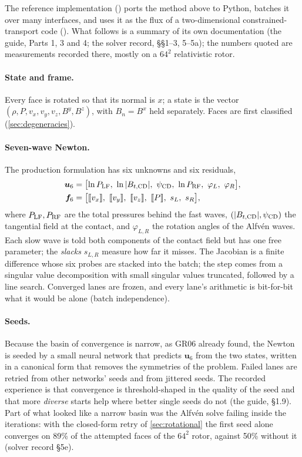 \documentclass[11pt,a4paper,oneside,openany]{book}
\theoremstyle{definition}
\theoremstyle{plain}
\theoremstyle{remark}
\newcommand{\jump}[1]{\llbracket #1\rrbracket}
\newcommand{\Ptot}{P}
\newcommand{\file}[1]{\texttt{\detokenize{#1}}}
\begin{document}
The reference implementation (\file{rmhd_final}) ports the method above to Python, batches
it over many interfaces, and uses it as the flux of a two-dimensional constrained-transport
code (\file{HLLD}). What follows is a summary of its own documentation (the guide, Parts
1, 3 and 4; the solver record, \S\S1--3, 5--5a); the numbers quoted are measurements
recorded there, mostly on a $64^2$ relativistic rotor.

\paragraph{State and frame.} Every face is rotated so that its normal is $x$; a state is the
vector $(\rho,\Ptot,v_x,v_y,v_z,B^y,B^z)$, with $B_n=B^x$ held separately. Faces are first
classified (\cref{sec:degeneracies}).

\paragraph{Seven-wave Newton.} The production formulation has six unknowns and six residuals,
\begin{align}
\bm u_6&=\bigl[\ln\Ptot_{\rm LF},\ \ln|B_{t,\rm CD}|,\ \psi_{\rm CD},\ \ln\Ptot_{\rm RF},\
\varphi_L,\ \varphi_R\bigr],\\
\bm f_6&=\bigl[\jump{v_x},\ \jump{v_y},\ \jump{v_z},\ \jump{\Ptot},\ s_L,\ s_R\bigr],
\end{align}
where $\Ptot_{\rm LF},\Ptot_{\rm RF}$ are the total pressures behind the fast waves,
$(|B_{t,\rm CD}|,\psi_{\rm CD})$ the tangential field at the contact, and
$\varphi_{L,R}$ the rotation angles of the Alfvén waves. Each slow wave is told both
components of the contact field but has one free parameter; the \emph{slacks}
$s_{L,R}$ measure how far it misses. The Jacobian is a finite difference whose six probes
are stacked into the batch; the step comes from a singular value decomposition with small
singular values truncated, followed by a line search. Converged lanes are frozen, and every
lane's arithmetic is bit-for-bit what it would be alone (batch independence).

\paragraph{Seeds.} Because the basin of convergence is narrow, as GR06 already found, the
Newton is seeded by a small neural network that predicts $\bm u_6$ from the two states,
written in a canonical form that removes the symmetries of the problem. Failed lanes are
retried from other networks' seeds and from jittered seeds. The recorded experience is that
convergence is threshold-shaped in the quality of the seed and that more \emph{diverse}
starts help where better single seeds do not (the guide, \S1.9). Part of what looked like a
narrow basin was the Alfvén solve failing inside the iterations: with the closed-form
retry of \cref{sec:rotational} the first seed alone converges on 89\% of the attempted
faces of the $64^2$ rotor, against 50\% without it (solver record \S5e).
\end{document}
